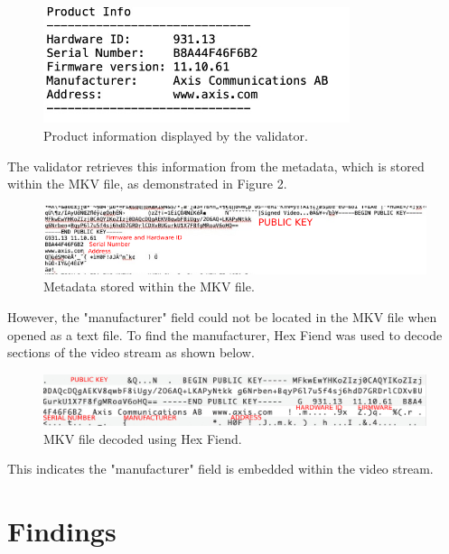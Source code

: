 \documentclass[a4paper,12pt]{article}
\begin{document}
\begin{figure}[h!]
    \centering
    \includegraphics[width=0.8\textwidth]{IN.jpeg}
    \caption{Product information displayed by the validator.}
    \label{fig:axis-dome-example}
\end{figure}

The validator retrieves this information from the metadata, which is stored within the MKV file, as demonstrated in Figure 2. 

\begin{figure}[h!]
    \centering
    \includegraphics[width=1\textwidth]{FIEL.png}
    \caption{Metadata stored within the MKV file.}
    \label{fig:axis-dome-example}
\end{figure}

However, the "manufacturer" field could not be located in the MKV file when opened as a text file. To find the manufacturer, Hex Fiend was used to decode sections of the video stream as shown below.

\begin{figure}[h!]
    \centering
    \includegraphics[width=1\textwidth]{K.png}
    \caption{MKV file decoded using Hex Fiend.}
    \label{fig:axis-dome-example}
\end{figure}

This indicates the "manufacturer" field is embedded within the video stream.

\newpage

\section{Findings}
\end{document}
